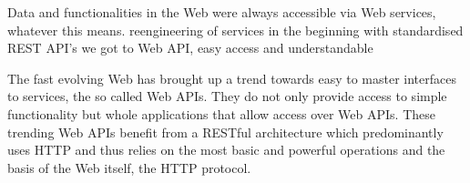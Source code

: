 


Data and functionalities in the Web were always accessible via Web services, whatever this means.
reengineering of services in the beginning
with standardised REST API's we got to Web API, easy access and understandable


The fast evolving Web has brought up a trend towards easy to master interfaces to services, the so called Web APIs.
They do not only provide access to simple functionality but whole applications that allow access over Web APIs.
These trending Web APIs benefit from a RESTful architecture which predominantly uses HTTP and thus relies on the most basic and powerful operations and the basis of the Web itself, the HTTP protocol. 

